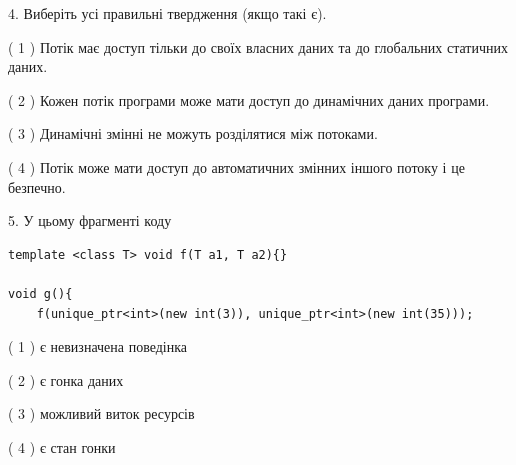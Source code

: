 \documentclass[12pt, ukrainian]{article}
\begin{document}
\begin {large}
{%
4. Виберіть усі правильні твердження (якщо такі є).\par
\vspace{2mm}

( 1 ) Потік має доступ тільки до своїх власних даних та до глобальних статичних даних.%

( 2 ) Кожен потік програми може мати доступ до динамічних даних програми.%

( 3 ) Динамічні змінні не можуть розділятися між потоками.%

( 4 ) Потік може мати доступ до автоматичних змінних іншого потоку і це безпечно.%


5. У цьому фрагменті коду
\begin{verbatim}
template <class T> void f(T a1, T a2){}

void g(){
    f(unique_ptr<int>(new int(3)), unique_ptr<int>(new int(35)));
\end{verbatim}

( 1 ) є невизначена поведінка%

( 2 ) є гонка даних%

( 3 ) можливий виток ресурсів%

( 4 ) є стан гонки%
}
\end {large}
\end{document}
